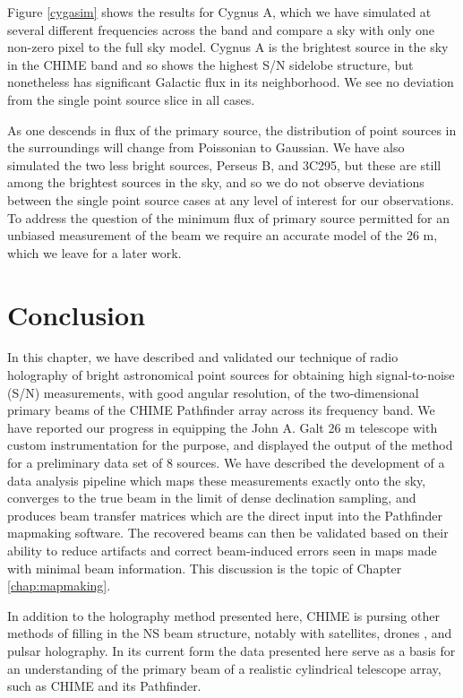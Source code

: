 Figure \ref{cygasim} shows the results for Cygnus A, which we have simulated at several different frequencies across the band and compare a sky with only one non-zero pixel to the full sky model. Cygnus A is the brightest source in the sky in the CHIME band and so shows the highest S/N sidelobe structure, but nonetheless has significant Galactic flux in its neighborhood. We see no deviation from the single point source slice in all cases.

As one descends in flux of the primary source, the distribution of point sources in the surroundings will change from Poissonian to Gaussian. We have also simulated the two less bright sources, Perseus B, and 3C295, but these are still among the brightest sources in the sky, and so we do not observe deviations between the single point source cases at any level of interest for our observations. To address the question of the minimum flux of primary source permitted for an unbiased measurement of the beam we require an accurate model of the 26 m, which we leave for a later work.

\section{Conclusion} \label{ch:hol:sec:conclusion}

In this chapter, we have described and validated our technique of radio holography of bright astronomical point sources for obtaining high signal-to-noise (S/N) measurements, with good angular resolution, of the two-dimensional primary beams of the CHIME Pathfinder array across its frequency band. We have reported our progress in equipping the John A. Galt 26 m telescope with custom instrumentation for the purpose, and displayed the output of the method for a preliminary data set of 8 sources. We have described the development of a data analysis pipeline which maps these measurements exactly onto the sky, converges to the true beam in the limit of dense declination sampling, and produces beam transfer matrices which are the direct input into the Pathfinder mapmaking software. The recovered beams can then be validated based on their ability to reduce artifacts and correct beam-induced errors seen in maps made with minimal beam information. This discussion is the topic of Chapter \ref{chap:mapmaking}.

In addition to the holography method presented here, CHIME is pursing other methods of filling in the NS beam structure, notably with satellites\citep{hol2, sat2}, drones \citep{drone}, and pulsar holography. In its current form the data presented here serve as a basis for an understanding of the primary beam of a realistic cylindrical telescope array, such as CHIME and its Pathfinder.
